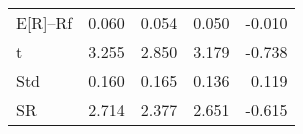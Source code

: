 \begin{tabular}{lrrrr}
\toprule
\midrule
E[R]--Rf & 0.060 & 0.054 & 0.050 & -0.010 \\
t & 3.255 & 2.850 & 3.179 & -0.738 \\
Std & 0.160 & 0.165 & 0.136 & 0.119 \\
SR & 2.714 & 2.377 & 2.651 & -0.615 \\
\bottomrule
\end{tabular}
